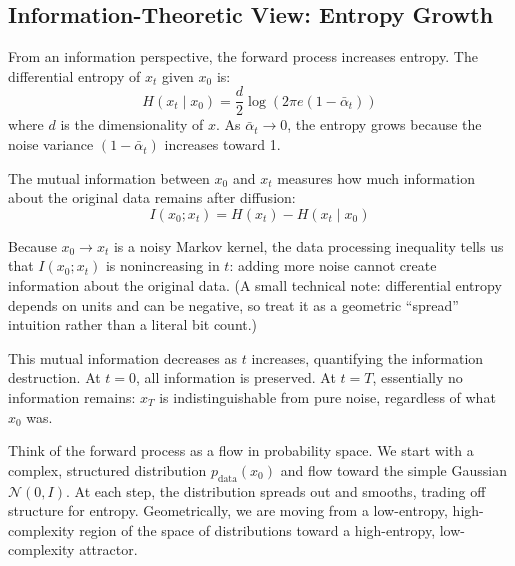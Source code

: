 \vspSection

\subsection{Information-Theoretic View: Entropy Growth}

From an information perspective, the forward process increases entropy. The differential entropy of $x_t$ given $x_0$ is:
%
\begin{equation}
H(x_t \mid x_0) = \frac{d}{2} \log(2\pi e (1 - \bar{\alpha}_t))
\end{equation}
%
where $d$ is the dimensionality of $x$. As $\bar{\alpha}_t \to 0$, the entropy grows because the noise variance $(1 - \bar{\alpha}_t)$ increases toward 1.

\vspPara

The mutual information between $x_0$ and $x_t$ measures how much information about the original data remains after diffusion:
%
\begin{equation}
I(x_0; x_t) = H(x_t) - H(x_t \mid x_0)
\end{equation}

\vspPara

Because $x_0 \to x_t$ is a noisy Markov kernel, the data processing inequality tells us that $I(x_0; x_t)$ is nonincreasing in $t$: adding more noise cannot create information about the original data. (A small technical note: differential entropy depends on units and can be negative, so treat it as a geometric ``spread'' intuition rather than a literal bit count.)

\vspPara

This mutual information decreases as $t$ increases, quantifying the information destruction. At $t=0$, all information is preserved. At $t=T$, essentially no information remains: $x_T$ is indistinguishable from pure noise, regardless of what $x_0$ was.

\vspBlock

\begin{geometrylens}
Think of the forward process as a flow in probability space. We start with a complex, structured distribution $p_{\text{data}}(x_0)$ and flow toward the simple Gaussian $\mathcal{N}(0,I)$. At each step, the distribution spreads out and smooths, trading off structure for entropy. Geometrically, we are moving from a low-entropy, high-complexity region of the space of distributions toward a high-entropy, low-complexity attractor.
\end{geometrylens}

